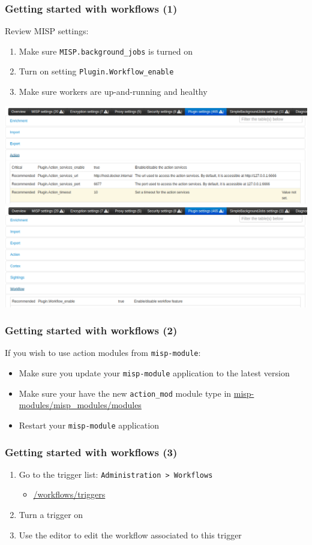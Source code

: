 \begin{frame}
    \frametitle{Getting started with workflows (1)}
    Review MISP settings:
    \begin{enumerate}
        \item Make sure \texttt{MISP.background\_jobs} is turned on
        \item Turn on setting \texttt{Plugin.Workflow\_enable}
        \item Make sure workers are up-and-running and healthy
    \end{enumerate}
    \begin{center}
        \includegraphics[width=0.75\linewidth]{pictures/settings-1.png}
        \includegraphics[width=0.75\linewidth]{pictures/settings-2.png}
    \end{center}
\end{frame}

\begin{frame}
    \frametitle{Getting started with workflows (2)}
    If you wish to use action modules from \texttt{misp-module}:
    \begin{itemize}
        \item Make sure you update your \texttt{misp-module} application to the latest version
        \item Make sure your have the new \texttt{action\_mod} module type in \url{misp-modules/misp\_modules/modules}
        \item Restart your \texttt{misp-module} application
    \end{itemize}
\end{frame}

\begin{frame}
    \frametitle{Getting started with workflows (3)}
    \begin{enumerate}
        \item Go to the trigger list: \texttt{Administration > Workflows}
        \begin{itemize}
            \item \url{/workflows/triggers}
        \end{itemize}
        \item Turn a trigger on
        \item Use the editor to edit the workflow associated to this trigger
    \end{enumerate}
\end{frame}

